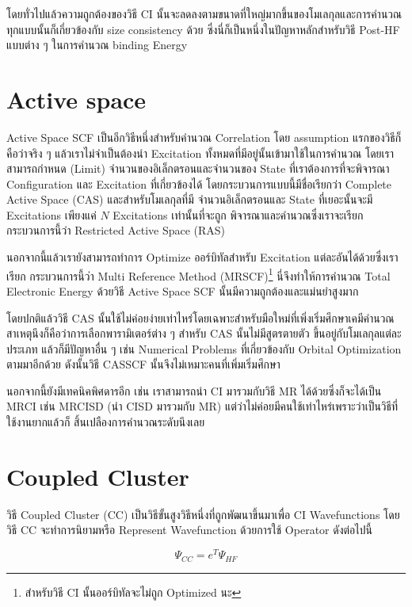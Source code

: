 โดยทั่วไปแล้วความถูกต้องของวิธี CI นั้นจะลดลงตามขนาดที่ใหญ่มากขึ้นของโมเลกุลและการคำนวณทุกแบบนั้นก็เกี่ยวข้องกับ
size consistency ด้วย ซึ่งนี่ก็เป็นหนึ่งในปัญหาหลักสำหรับวิธี Post-HF แบบต่าง ๆ ในการคำนวณ binding Energy

\section{Active space}

Active Space SCF เป็นอีกวิธีหนึ่งสำหรับคำนวณ Correlation โดย assumption แรกของวิธีก็คือว่าจริง ๆ
แล้วเราไม่จำเป็นต้องนำ Excitation ทั้งหมดที่มีอยู่นั้นเข้ามาใช้ในการคำนวณ โดยเราสามารถกำหนด (Limit)
จำนวนของอิเล็กตรอนและจำนวนของ State ที่เราต้องการที่จะพิจารณา Configuration และ Excitation
ที่เกี่ยวข้องได้ โดยกระบวนการแบบนี้มีชื่อเรียกว่า Complete Active Space (CAS) และสำหรับโมเลกุลที่มี%
จำนวนอิเล็กตรอนและ State ที่เยอะนั้นจะมี Excitations เพียงแค่ $N$ Excitations เท่านั้นที่จะถูก%
พิจารณาและคำนวณซึ่งเราจะเรียกกระบวนการนี้ว่า Restricted Active Space (RAS)

นอกจากนี้แล้วเรายังสามารถทำการ Optimize ออร์บิทัลสำหรับ Excitation แต่ละอันได้ด้วยซึ่งเราเรียก%
กระบวนการนี้ว่า Multi Reference Method (MRSCF)\footnote{สำหรับวิธี CI นั้นออร์บิทัลจะไม่ถูก 
Optimized นะ} นี่จึงทำให้การคำนวณ Total Electronic Energy ด้วยวิธี Active Space SCF
นั้นมีความถูกต้องและแม่นยำสูงมาก

โดยปกติแล้ววิธี CAS นั้นใช้ไม่ค่อยง่ายเท่าไหร่โดยเฉพาะสำหรับมือใหม่ที่เพิ่งเริ่มศึกษาเคมีคำนวณ
สาเหตุนึงก็คือว่าการเลือกพารามิเตอร์ต่าง ๆ สำหรับ CAS นั้นไม่มีสูตรตายตัว ขึ้นอยู่กับโมเลกุลแต่ละประเภท
แล้วก็มีปัญหาอื่น ๆ เช่น Numerical Problems ที่เกี่ยวข้องกับ Orbital Optimization ตามมาอีกด้วย
ดังนั้นวิธี CASSCF นั้นจึงไม่เหมาะคนที่เพิ่มเริ่มศึกษา

นอกจากนี้ยังมีเทคนิคพิศดารอีก เช่น เราสามารถนำ CI มารวมกับวิธี MR ได้ด้วยซึ่งก็จะได้เป็น MRCI
เช่น MRCISD (นำ CISD มารวมกับ MR) แต่ว่าไม่ค่อยมีคนใช้เท่าไหร่เพราะว่าเป็นวิธีที่ใช้งานยากแล้วก็%
สิ้นเปลืองการคำนวณระดับนึงเลย

\section{Coupled Cluster}

วิธี Coupled Cluster (CC) เป็นวิธีขั้นสูงวิธีหนึ่งที่ถูกพัฒนาขึ้นมาเพื่อ CI Wavefunctions
โดยวิธี CC จะทำการนิยามหรือ Represent Wavefunction ด้วยการใช้ Operator ดังต่อไปนี้

\begin{equation}
    \Psi_{CC} = e^{T} \Psi_{HF}
\end{equation}

